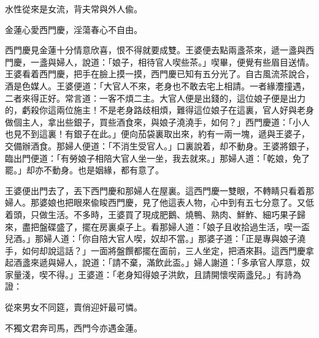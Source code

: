 水性從來是女流，背夫常與外人偸。

金蓮心愛西門慶，淫蕩春心不自由。

西門慶見金蓮十分情意欣喜，恨不得就要成雙。王婆便去點兩盞茶來，遞一盞與西門慶，一盞與婦人，說道：「娘子，相待官人喫些茶。」喫畢，便覺有些眉目送情。王婆看着西門慶，把手在臉上摸一摸，西門慶已知有五分光了。自古風流茶說合，酒是色媒人。王婆便道：「大官人不來，老身也不敢去宅上相請。一者緣灋撞遇，二者來得正好。常言道：一客不煩二主。大官人便是出錢的，這位娘子便是出力的，虧殺你這兩位施主！不是老身路歧相煩，難得這位娘子在這裏，官人好與老身做個主人，拿出些銀子，買些酒食來，與娘子澆澆手，如何？」西門慶道：「小人也見不到這裏！有銀子在此。」便向茄袋裏取出來，約有一兩一塊，遞與王婆子，交備辦酒食。那婦人便道：「不消生受官人。」口裏說着，却不動身。王婆將銀子，臨出門便道：「有勞娘子相陪大官人坐一坐，我去就來。」那婦人道：「乾娘，免了罷。」却亦不動身。也是姻緣，都有意了。

王婆便出門去了，丟下西門慶和那婦人在屋裏。這西門慶一雙眼，不轉睛只看着那婦人。那婆娘也把眼來偸睃西門慶，見了他這表人物，心中到有五七分意了。又低着頭，只做生活。不多時，王婆買了現成肥鵝、燒鴨、熟肉、鮮鮓、細巧果子歸來，盡把盤碟盛了，擺在房裏桌子上。看那婦人道：「娘子且收拾過生活，喫一盃兒酒。」那婦人道：「你自陪大官人喫，奴却不當。」那婆子道：「正是專與娘子澆手，如何却說這話？」一面將盤饌都擺在面前，三人坐定，把酒來斟。這西門慶拿起酒盞來遞與婦人，說道：「請不棄，滿飲此盃。」婦人謝道：「多承官人厚意，奴家量淺，喫不得。」王婆道：「老身知得娘子洪飲，且請開懷喫兩盞兒。」有詩為證：

從來男女不同筵，賣俏迎奸最可憐。

不獨文君奔司馬，西門今亦遇金蓮。

